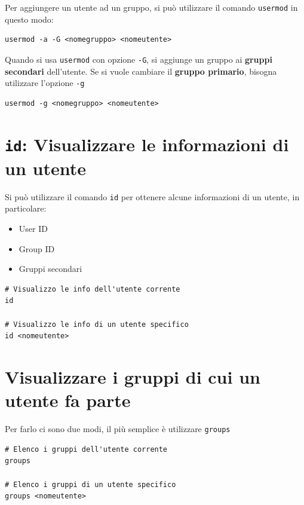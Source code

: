 \documentclass[a4paper]{report}
\newenvironment{info}{\begin{tcolorbox}[fonttitle=\sffamily\bfseries\large,title=Info,colframe=blue!75!white]}{\end{tcolorbox}}
\newenvironment{code}{\begin{tcolorbox}[size=small]}{\end{tcolorbox}}
\begin{document}
Per aggiungere un utente ad un gruppo, si può utilizzare il comando \texttt{usermod} in questo modo:
\begin{code} 
\begin{lstlisting}
usermod -a -G <nomegruppo> <nomeutente>
\end{lstlisting}
\end{code}

\begin{info}
	Quando si usa \texttt{usermod} con opzione \texttt{-G}, si aggiunge un gruppo ai \textbf{gruppi secondari} dell'utente. Se si vuole cambiare il \textbf{gruppo primario}, bisogna utilizzare l'opzione \texttt{-g}
	
	\begin{lstlisting}
usermod -g <nomegruppo> <nomeutente>
	\end{lstlisting}
\end{info}

\section{\texttt{id}: Visualizzare le informazioni di un utente}
\label{sec:id}
Si può utilizzare il comando \texttt{id} per ottenere alcune informazioni di un utente, in particolare:
\begin{itemize}
	\item User ID
	\item Group ID
	\item Gruppi secondari
\end{itemize}

\begin{code} 
\begin{lstlisting}
# Visualizzo le info dell'utente corrente
id

# Visualizzo le info di un utente specifico
id <nomeutente>
\end{lstlisting}
\end{code}

\section{Visualizzare i gruppi di cui un utente fa parte}

Per farlo ci sono due modi, il più semplice è utilizzare \texttt{groups}
\begin{code} 
\begin{lstlisting}
# Elenco i gruppi dell'utente corrente
groups

# Elenco i gruppi di un utente specifico
groups <nomeutente>
\end{lstlisting}
\end{code}
\end{document}
